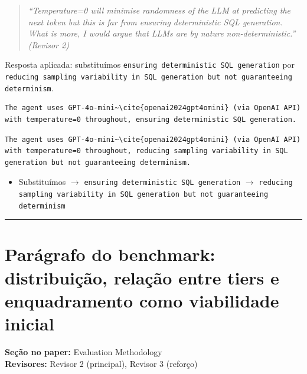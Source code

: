 \documentclass[11pt,a4paper]{article}
\begin{document}
\begin{quote}
\textit{``Temperature=0 will minimise randomness of the LLM at predicting the next token but this is far from ensuring deterministic SQL generation. What is more, I would argue that LLMs are by nature non-deterministic.''}
\hfill\textit{(Revisor 2)}
\end{quote}

\noindent Resposta aplicada: substituímos \texttt{ensuring deterministic SQL generation} por \texttt{reducing sampling variability in SQL generation but not guaranteeing determinism}.

\begin{originalblock}
\begin{lstlisting}[style=texsnippet]
The agent uses GPT-4o-mini~\cite{openai2024gpt4omini} (via OpenAI API) with temperature=0 throughout, ensuring deterministic SQL generation.
\end{lstlisting}
\end{originalblock}

\begin{finalblock}
\begin{lstlisting}[style=texsnippet]
The agent uses GPT-4o-mini~\cite{openai2024gpt4omini} (via OpenAI API) with temperature=0 throughout, reducing sampling variability in SQL generation but not guaranteeing determinism.
\end{lstlisting}
\end{finalblock}

\begin{trackblock}
\begin{itemize}
  \item Substituímos $\to$ \texttt{ensuring deterministic SQL generation} $\to$ \texttt{reducing sampling variability in SQL generation but not guaranteeing determinism}
\end{itemize}
\end{trackblock}

\bigskip\hrule\bigskip

\section{Parágrafo do benchmark: distribuição, relação entre tiers e enquadramento como viabilidade inicial}

\textbf{Seção no paper:} Evaluation Methodology\\
\textbf{Revisores:} Revisor 2 (principal), Revisor 3 (reforço)
\end{document}
